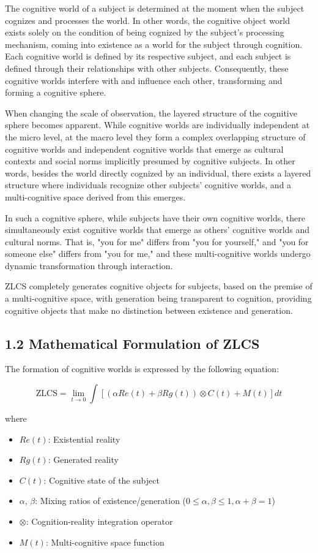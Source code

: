 \documentclass{article}
\begin{document}
The cognitive world of a subject is determined at the moment when the subject cognizes and processes the world. In other words, the cognitive object world exists solely on the condition of being cognized by the subject's processing mechanism, coming into existence as a world for the subject through cognition. Each cognitive world is defined by its respective subject, and each subject is defined through their relationships with other subjects. Consequently, these cognitive worlds interfere with and influence each other, transforming and forming a cognitive sphere.

When changing the scale of observation, the layered structure of the cognitive sphere becomes apparent. While cognitive worlds are individually independent at the micro level, at the macro level they form a complex overlapping structure of cognitive worlds and independent cognitive worlds that emerge as cultural contexts and social norms implicitly presumed by cognitive subjects. In other words, besides the world directly cognized by an individual, there exists a layered structure where individuals recognize other subjects' cognitive worlds, and a multi-cognitive space derived from this emerges.

In such a cognitive sphere, while subjects have their own cognitive worlds, there simultaneously exist cognitive worlds that emerge as others' cognitive worlds and cultural norms. That is, "you for me" differs from "you for yourself," and "you for someone else" differs from "you for me," and these multi-cognitive worlds undergo dynamic transformation through interaction.

ZLCS completely generates cognitive objects for subjects, based on the premise of a multi-cognitive space, with generation being transparent to cognition, providing cognitive objects that make no distinction between existence and generation.

\subsection{1.2 Mathematical Formulation of ZLCS}

The formation of cognitive worlds is expressed by the following equation:

$$
\text{ZLCS} = \lim_{t \to 0} \int [(\alpha Re(t) + \beta Rg(t)) \otimes C(t) + M(t)] dt
$$

where
\begin{itemize}
    \item $Re(t)$: Existential reality
    \item $Rg(t)$: Generated reality
    \item $C(t)$: Cognitive state of the subject
    \item $\alpha$, $\beta$: Mixing ratios of existence/generation ($0 \leq \alpha, \beta \leq 1, \alpha + \beta = 1$)
    \item $\otimes$: Cognition-reality integration operator
    \item $M(t)$: Multi-cognitive space function
\end{itemize}
\end{document}
